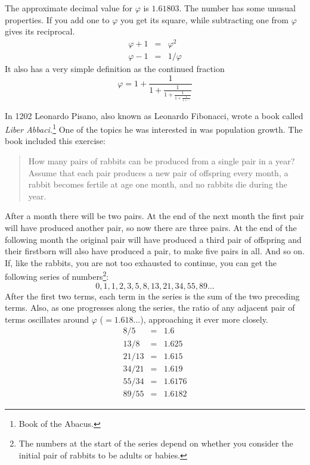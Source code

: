 \documentclass[10pt,a4paper,extrafontsizes]{memoir}
\begin{document}
\begin{paracol}{2}
    The approximate decimal value for $\varphi$ is $1.61803$. 
The number has some unusual properties. If you add one to $\varphi$
you get its square, while subtracting one from $\varphi$ gives its 
reciprocal.
\begin{eqnarray}
  \varphi + 1 & = & \varphi^{2} \\
  \varphi - 1 & = & 1/\varphi
\end{eqnarray}
It also has a very simple definition as the continued fraction
\begin{equation}
\varphi = 1 + \frac{1}{\displaystyle 1 + \frac{1}{\displaystyle 1 + \frac{1}{\displaystyle 1 + \frac{1}{1 + \cdots}}}}
\end{equation}


    In 1202 Leonardo Pisano, 
also known as Leonardo Fibonacci, wrote a
book called \textit{Liber Abbaci.}\footnote{Book of the Abacus.} One of the 
topics he was interested in was population growth. The book included
this exercise: 
\begin{quote}
How many pairs of rabbits can be produced from a single 
pair in a year?
Assume that each pair produces a new pair of offspring every month,
a rabbit becomes fertile at age one month, and no rabbits die during the
year.
\end{quote}
After a month there will be two pairs. At the end of the next month the
first pair will have produced another pair, so now there are three pairs.
At the end of the following  month the original pair will have produced a
third pair of offspring and their firstborn will also have produced a pair, 
to make five pairs in all. And so on. 
If, like the rabbits, you are not too exhausted
to continue, you can get the following series of 
numbers\footnote{The numbers at the start of the series
depend on whether you consider the initial pair of rabbits to be adults or 
babies.\label{fn:rabbits}}:
\begin{displaymath}
0,1,1,2,3,5,8,13,21,34, 55, 89 \ldots
\end{displaymath}
After the first two terms, each term in the series is the sum of the two
preceding terms. Also, as one progresses along the series, the ratio of
any adjacent pair of terms oscillates around $\varphi$ ($= 1.618 \ldots$),
approaching it ever more closely.
\begin{eqnarray*}
  8/5 & = & 1.6 \\
  13/8 & = & 1.625 \\
  21/13 & = & 1.615 \\
  34/21 & = & 1.619 \\
  55/34 & = & 1.6176 \\
  89/55 & = & 1.6182
\end{eqnarray*}


\end{paracol}
\end{document}
